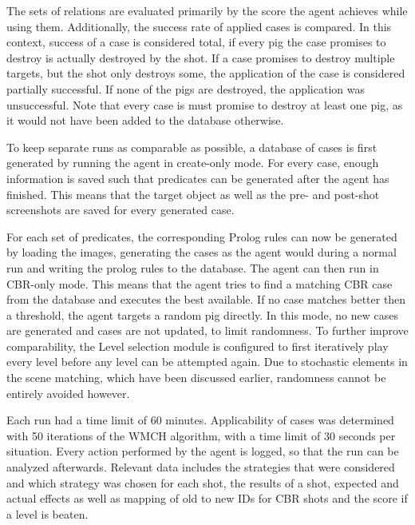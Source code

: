 The sets of relations are evaluated primarily by the score the agent achieves while using them. Additionally, the success rate of applied cases is compared.
In this context, success of a case is considered total, if every pig the case promises to destroy is actually destroyed by the shot. If a case promises to destroy multiple targets, but the shot only destroys some, the application of the case is considered partially successful. If none of the pigs are destroyed, the application was unsuccessful.
Note that every case is must promise to destroy at least one pig, as it would not have been added to the database otherwise.


To keep separate runs as comparable as possible, a database of cases is first generated by running the agent in create-only mode.
For every case, enough information is saved such that predicates can be generated after the agent has finished. This means that the target object as well as the pre- and post-shot screenshots are saved for every generated case.

For each set of predicates, the corresponding Prolog rules can now be generated by loading the images, generating the cases as the agent would during a normal run and writing the prolog rules to the database. The agent can then run in CBR-only mode. This means that the agent tries to find a matching CBR case from the database and executes the best available. If no case matches better then a threshold, the agent targets a random pig directly. In this mode, no new cases are generated and cases are not updated, to limit randomness.
To further improve comparability, the Level selection module is configured to first iteratively play every level before any level can be attempted again.
Due to stochastic elements in the scene matching, which have been discussed earlier, randomness cannot be entirely avoided however.

Each run had a time limit of 60 minutes.
Applicability of cases was determined with 50 iterations of the \ac{WMCH} algorithm, with a time limit of 30 seconds per situation. Every action performed by the agent is logged, so that the run can be analyzed afterwards.
Relevant data includes the strategies that were considered and which strategy was chosen for each shot, the results of a shot, expected and actual effects  as well as mapping of old to new IDs for CBR shots and the score if a level is beaten.


